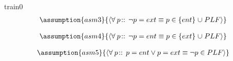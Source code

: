 \documentclass[12pt]{amsart}
\begin{document}
\begin{machine}{train0}
\begin{align*}
\assumption{asm3}
{	\qforall{p}{}{ \neg p = ext \equiv p \in \{ent\} \bunion PLF }	}
\end{align*}

\begin{align*}
\assumption{asm4}
{	\qforall{p}{}{ \neg p = ent \equiv p \in \{ext\} \bunion PLF }	}
\end{align*}

\begin{align*}
\assumption{asm5}
{	\qforall{p}{}{ p = ent \lor p = ext \equiv \neg p \in PLF }	}
\end{align*}


\end{machine}
\end{document}
